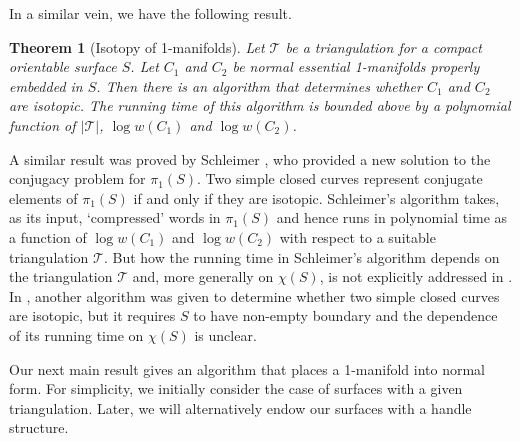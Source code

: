 \documentclass[oneside]{amsart}
\numberwithin{equation}{section}
\theoremstyle{plain}
\newtheorem{theorem}[equation]{Theorem}
\theoremstyle{definition}
\newcommand{\calT}{{\mathcal{T}}}
\begin{document}

In a similar vein, we have the following result.

\begin{theorem}[{\sc Isotopy of 1-manifolds}]
\label{Thm:IsotopyProblem}
Let $\mathcal{T}$ be a triangulation for a compact orientable surface $S$. Let $C_1$ and $C_2$ be normal essential 1-manifolds properly embedded in $S$. Then there is an algorithm that determines whether $C_1$ and $C_2$ are isotopic. The running time of this algorithm is bounded above by a polynomial function of $|\mathcal{T}|$, $\log w(C_1)$ and $\log w(C_2)$.
\end{theorem}

A similar result was proved by Schleimer \cite[Theorem A.7]{Schleimer:Word}, who provided a new solution to the conjugacy problem for $\pi_1(S)$. Two simple closed curves represent conjugate elements of $\pi_1(S)$ if and only if they are isotopic. Schleimer's algorithm takes, as its input, `compressed' words in $\pi_1(S)$ and hence runs in polynomial time as a function of $\log w(C_1)$ and $\log w(C_2)$ with respect to a suitable triangulation $\calT$. But how the running time in Schleimer's algorithm depends on the triangulation $\mathcal{T}$ and, more generally on $\chi(S)$, is not explicitly addressed in \cite{Schleimer:Word}. In \cite[Theorem 2(a)]{SSS1}, another algorithm was given to determine whether two simple closed curves are isotopic, but it requires $S$ to have non-empty boundary and the dependence of its running time on $\chi(S)$ is unclear.

Our next main result gives an algorithm that places a 1-manifold into normal form. For simplicity, we initially consider the case of surfaces with a given triangulation. Later, we will alternatively endow our surfaces with a handle structure.
\end{document}
